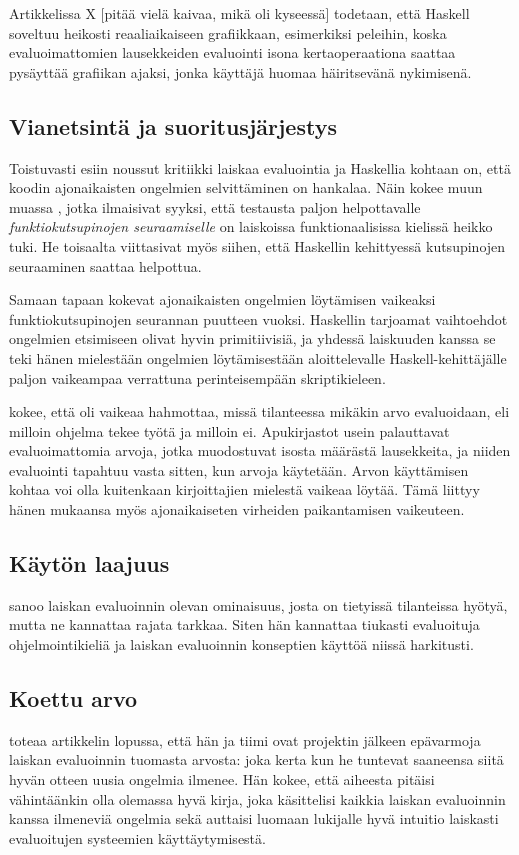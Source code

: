 Artikkelissa X [pitää vielä kaivaa, mikä oli kyseessä] todetaan, että Haskell soveltuu heikosti reaaliaikaiseen grafiikkaan, esimerkiksi peleihin, koska evaluoimattomien lausekkeiden evaluointi isona kertaoperaationa saattaa pysäyttää grafiikan ajaksi, jonka käyttäjä huomaa häiritsevänä nykimisenä.

\subsection{Vianetsintä ja suoritusjärjestys}

Toistuvasti esiin noussut kritiikki laiskaa evaluointia ja Haskellia kohtaan on, että koodin ajonaikaisten ongelmien selvittäminen on hankalaa. Näin kokee muun muassa \citet{daniels2012experience}, jotka ilmaisivat syyksi, että testausta paljon helpottavalle \textit{funktiokutsupinojen seuraamiselle} on laiskoissa funktionaalisissa kielissä heikko tuki. He toisaalta viittasivat myös siihen, että Haskellin kehittyessä kutsupinojen seuraaminen saattaa helpottua.

Samaan tapaan \citet{pop2010experience} kokevat ajonaikaisten ongelmien löytämisen vaikeaksi funktiokutsupinojen seurannan puutteen vuoksi. Haskellin tarjoamat vaihtoehdot ongelmien etsimiseen olivat hyvin primitiivisiä, ja yhdessä laiskuuden kanssa se teki hänen mielestään ongelmien löytämisestään aloittelevalle Haskell-kehittäjälle paljon vaikeampaa verrattuna perinteisempään skriptikieleen.

\citet{sampson2009experience} kokee, että oli vaikeaa hahmottaa, missä tilanteessa mikäkin arvo evaluoidaan, eli milloin ohjelma tekee työtä ja milloin ei. Apukirjastot usein palauttavat evaluoimattomia arvoja, jotka muodostuvat isosta määrästä lausekkeita, ja niiden evaluointi tapahtuu vasta sitten, kun arvoja käytetään. Arvon käyttämisen kohtaa voi olla kuitenkaan kirjoittajien mielestä vaikeaa löytää. Tämä liittyy hänen mukaansa myös ajonaikaiseten virheiden paikantamisen vaikeuteen.

\subsection{Käytön laajuus}
\citet{vesakarvonen} sanoo laiskan evaluoinnin olevan ominaisuus, josta on tietyissä tilanteissa hyötyä, mutta ne kannattaa rajata tarkkaa. Siten hän kannattaa tiukasti evaluoituja ohjelmointikieliä ja laiskan evaluoinnin konseptien käyttöä niissä harkitusti.

\subsection{Koettu arvo}

\citet{sampson2009experience} toteaa artikkelin lopussa, että hän ja tiimi ovat projektin jälkeen epävarmoja laiskan evaluoinnin tuomasta arvosta: joka kerta kun he tuntevat saaneensa siitä hyvän otteen uusia ongelmia ilmenee. Hän kokee, että aiheesta pitäisi vähintäänkin olla olemassa hyvä kirja, joka käsittelisi kaikkia laiskan evaluoinnin kanssa ilmeneviä ongelmia sekä auttaisi luomaan lukijalle hyvä intuitio laiskasti evaluoitujen systeemien käyttäytymisestä.

